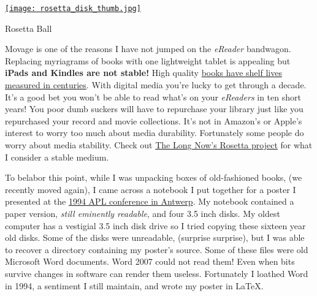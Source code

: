 \captionsetup[floatingfigure]{labelformat=empty}
\begin{floatingfigure}[l]{0.25\textwidth}
\centering
\href{http://blog.longnow.org/2008/08/20/very-long-term-backup/}{\texttt{[image: rosetta\_disk\_thumb.jpg]}}
\caption{Rosetta  Ball}
\label{fig:903X0}
\end{floatingfigure}Movage is one of the reasons I have not jumped on the
\emph{eReader} bandwagon. Replacing myriagrams of books with one
lightweight tablet is appealing but \textbf{iPads and Kindles are not
stable!} High quality
\href{http://news.bbc.co.uk/2/hi/entertainment/3696333.stm}{books have
shelf lives measured in centuries}. With digital media you're lucky to
get through a decade. It's a good bet you won't be able to read what's
on your \emph{eReaders} in ten short years! You poor dumb suckers will
have to repurchase your library just like you repurchased your record
and movie collections. It's not in Amazon's or Apple's interest to worry
too much about media durability. Fortunately some people do worry about
media stability. Check out
\href{http://www.rosettaproject.org/disk/concept/}{The Long Now's
Rosetta project} for what I consider a stable medium.

To belabor this point, while I was unpacking boxes of old-fashioned
books, (we recently moved again), I came across a notebook I put
together for a poster I presented at the
\href{http://www.sigapl.org/proceedings94.htm}{1994 APL conference in
Antwerp}. My notebook contained a paper version, \emph{still eminently
readable}, and four 3.5 inch disks. My oldest computer has a vestigial
3.5 inch disk drive so I tried copying these sixteen year old disks.
Some of the disks were unreadable, (surprise surprise), but I was able
to recover a directory containing my poster's source. Some of these
files were old Microsoft Word documents. Word 2007 could not read them!
Even when bits survive changes in software can render them useless.
Fortunately I loathed Word in 1994, a sentiment I still maintain, and
wrote my poster in \LaTeX.

